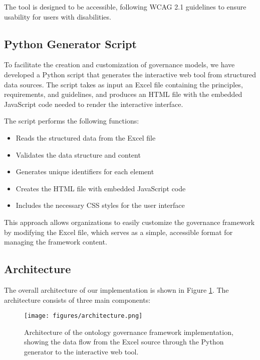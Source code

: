 \documentclass[conference]{IEEEtran}
\begin{document}
The tool is designed to be accessible, following WCAG 2.1 guidelines to ensure usability for users with disabilities.

\subsection{Python Generator Script}

To facilitate the creation and customization of governance models, we have developed a Python script that generates the interactive web tool from structured data sources. The script takes as input an Excel file containing the principles, requirements, and guidelines, and produces an HTML file with the embedded JavaScript code needed to render the interactive interface.

The script performs the following functions:

\begin{itemize}
    \item Reads the structured data from the Excel file
    \item Validates the data structure and content
    \item Generates unique identifiers for each element
    \item Creates the HTML file with embedded JavaScript code
    \item Includes the necessary CSS styles for the user interface
\end{itemize}

This approach allows organizations to easily customize the governance framework by modifying the Excel file, which serves as a simple, accessible format for managing the framework content.

\subsection{Architecture}

The overall architecture of our implementation is shown in Figure \ref{fig:architecture}. The architecture consists of three main components:

\begin{figure}[htbp]
\centerline{\texttt{[image: figures/architecture.png]}}
\caption{Architecture of the ontology governance framework implementation, showing the data flow from the Excel source through the Python generator to the interactive web tool.}
\label{fig:architecture}
\end{figure}
\end{document}
